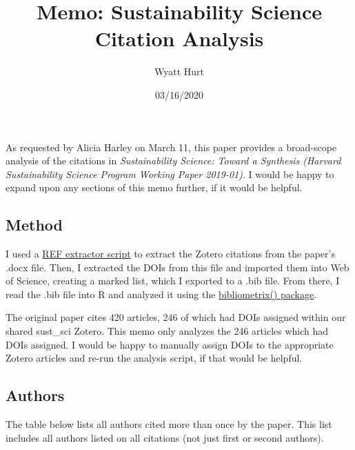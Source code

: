 \documentclass[]{article}
\title{Memo: Sustainability Science Citation Analysis}
\author{Wyatt Hurt}
\date{03/16/2020}
\begin{document}
\maketitle

As requested by Alicia Harley on March 11, this paper provides a
broad-scope analysis of the citations in \emph{Sustainability Science:
Toward a Synthesis (Harvard Sustainability Science Program Working Paper
2019-01)}. I would be happy to expand upon any sections of this memo
further, if it would be helpful.

\hypertarget{method}{%
\subsection{Method}\label{method}}

I used a \href{https://rintze.zelle.me/ref-extractor/}{REF extractor
script} to extract the Zotero citations from the paper's .docx file.
Then, I extracted the DOIs from this file and imported them into Web of
Science, creating a marked list, which I exported to a .bib file. From
there, I read the .bib file into R and analyzed it using the
\href{https://www.bibliometrix.org/}{bibliometrix() package}.

The original paper cites 420 articles, 246 of which had DOIs assigned
within our shared sust\_sci Zotero. This memo only analyzes the 246
articles which had DOIs assigned. I would be happy to manually assign
DOIs to the appropriate Zotero articles and re-run the analysis script,
if that would be helpful.

\hypertarget{authors}{%
\subsection{Authors}\label{authors}}

The table below lists all authors cited more than once by the paper.
This list includes all authors listed on all citations (not just first
or second authors). \captionsetup[table]{labelformat=empty,skip=1pt}
\end{document}
